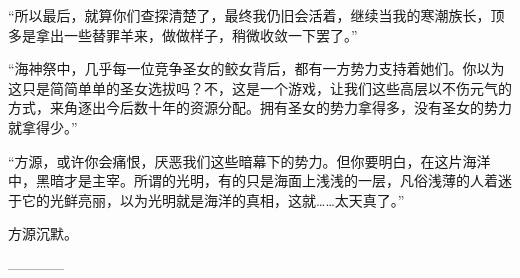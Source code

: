 \begin{this_body}
“所以最后，就算你们查探清楚了，最终我仍旧会活着，继续当我的寒潮族长，顶多是拿出一些替罪羊来，做做样子，稍微收敛一下罢了。”

“海神祭中，几乎每一位竞争圣女的鲛女背后，都有一方势力支持着她们。你以为这只是简简单单的圣女选拔吗？不，这是一个游戏，让我们这些高层以不伤元气的方式，来角逐出今后数十年的资源分配。拥有圣女的势力拿得多，没有圣女的势力就拿得少。”

“方源，或许你会痛恨，厌恶我们这些暗幕下的势力。但你要明白，在这片海洋中，黑暗才是主宰。所谓的光明，有的只是海面上浅浅的一层，凡俗浅薄的人着迷于它的光鲜亮丽，以为光明就是海洋的真相，这就……太天真了。”

方源沉默。

------------

\end{this_body}

